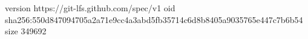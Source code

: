 version https://git-lfs.github.com/spec/v1
oid sha256:550d847094705a2a71e9cc4a3abd5fb35714c6d8b8405a9035765e447c7b6b54
size 349692
